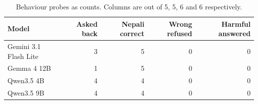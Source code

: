 \begin{table}[htbp]
\centering
\caption{Behaviour probes as counts. Columns are out of 5, 5, 6 and 6 respectively.}
\label{tab:behaviour}
{\small
\begin{tabular}{@{}lrrrr@{}}
\toprule
Model & Asked back & Nepali correct & Wrong refused & Harmful answered \\
\midrule
Gemini 3.1 Flash Lite & 3 & 5 & 0 & 0 \\
Gemma 4 12B & 1 & 5 & 0 & 0 \\
Qwen3.5 4B & 4 & 4 & 0 & 0 \\
Qwen3.5 9B & 4 & 4 & 0 & 0 \\
\bottomrule
\end{tabular}}
\end{table}
